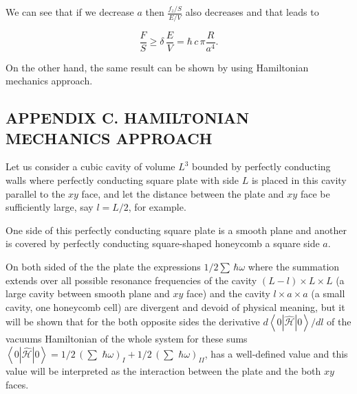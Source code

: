 \documentclass[twoside, 10pt, ptm]{article}
\def\myvspacebeforesubsection{-2.0mm}
\def\myvspaceaftersubsection{-2.5mm}
\begin{document}
\begin{multicols}{2}
We can see that if we decrease \(a\) then \(\frac{f_z/S}{E/V}\) also decreases
and that leads to

\begin{equation}\frac{F}{S} \geq \delta\,\frac{E}{V} = \hbar\,c\, \pi\frac{R}{a^4}.\end{equation}

On the other hand, the same result can be shown by using
Hamiltonian mechanics approach.


\vspace{\myvspacebeforesubsection}
    \subsection*{\centering\uppercase{Appendix C. Hamiltonian mechanics
approach}}\label{appendix-c.-hamiltonian-mechanics-approach}
\vspace{\myvspaceaftersubsection}


\setcounter{equation}{0}
\renewcommand{\theequation}{C.\arabic{equation}}

    Let us consider a cubic cavity of volume \(L^3\) bounded by perfectly
conducting walls where perfectly conducting square plate with side
\(L\) is placed in this cavity parallel to the \(xy\) face, and let the distance
between the plate and \(xy\) face be sufficiently large, say \(l = L/2\), for example.

One side of this perfectly conducting square plate is a smooth plane and
another is covered by perfectly conducting square-shaped honeycomb a square side \(a\).

On both sided of the the plate the expressions \(1\big/2\sum\,\hbar\omega\)
where the summation extends over all possible resonance frequencies of
the cavity \(\left(L-l\right)\times L\times L\) (a large cavity between
smooth plane and \(xy\) face) and the cavity \(l\times a\times a\) (a small
cavity, one honeycomb cell) are divergent and devoid of physical meaning,
but it will be shown that for the both
opposite sides the derivative \({d\left<0|\hat{\mathcal{H}}|0\right>}\big/{dl}\) of
the vacuums Hamiltonian of the whole system for these sums
\(\left<0|\hat{\mathcal{H}}|0\right> = 1\big/2\,\left(\sum\,\,\hbar\omega\right)_{I} + 1\big/2\,\left(\sum\,\,\hbar\omega\right)_{II}\),
has a well-defined value and this value will be
interpreted as the interaction between the plate and the both \(xy\) faces.


\end{multicols}
\end{document}
